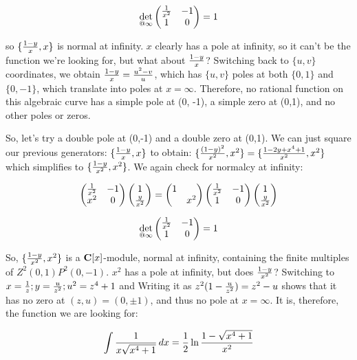 $$\det_{@ \infty} \begin{pmatrix}{1\over x^2} & -1 \cr 1 & 0\end{pmatrix} = 1$$

so $\{ {{1-y}\over{x}}, x \} $ is normal at infinity.  $x$ clearly has
a pole at infinity, so it can't be the function we're looking for, but
what about ${{1-y}\over{x}}$?  Switching back to $\{u,v\}$
coordinates, we obtain ${{1-y}\over{x}} = {{u^2-v}\over u}$, which has
$\{u,v\}$ poles at both $\{0,1\}$ and $\{0,-1\}$, which translate into
poles at $x=\infty$.  Therefore, no rational function on this
algebraic curve has a simple pole at (0, -1), a simple zero at (0,1),
and no other poles or zeros.

\vfill\eject

So, let's try a double pole at (0,-1) and a double zero at (0,1).  We
can just square our previous generators:
$\{ {{1-y}\over{x}}, x \} $
to obtain: 
$\{ {(1-y)^2\over{x^2}}, x^2 \} = \{ {{1-2y+x^4+1}\over{x^2}}, x^2 \}$
which simplifies to
$\{ {{1-y}\over{x^2}}, x^2 \}$.  We again check for normalcy
at infinity:

$$\begin{pmatrix}
{1\over{x^2}} & -1 \cr
x^2 & 0\end{pmatrix} \begin{pmatrix}1 \cr {y\over{x^2}}\end{pmatrix} = \begin{pmatrix}1 & \cr & x^2\end{pmatrix}\begin{pmatrix}
{1\over{x^2}} & -1 \cr
1 & 0\end{pmatrix}
\begin{pmatrix}1 \cr {y\over{x^2}}\end{pmatrix} $$

$$\det_{@\infty}\begin{pmatrix}
{1\over{x^2}} & -1 \cr
1 & 0\end{pmatrix} = 1$$

So, $\{{{1-y}\over{x^2}}, x^2\}$ is a ${\bf C}[x]$-module, normal at
infinity, containing the finite multiples of $Z^2(0,1)P^2(0,-1)$.
$x^2$ has a pole at infinity, but does ${1-y}\over{x^2}$?
Switching to $x={1\over z}; y={u\over{z^2}}; u^2 = z^4 + 1$ and
Writing it as $z^2(1-{u\over{z^2}}) = z^2 - u$ shows that it has no
zero at $(z,u) = (0, \pm 1)$, and thus no pole at $x = \infty$.  It
is, therefore, the function we are looking for:

$$\int {1\over{x\sqrt{x^4+1}}} \, dx
   = {1\over2} \ln{{1-\sqrt{x^4+1}}\over{x^2}}$$

